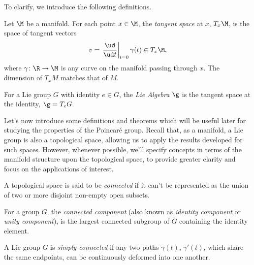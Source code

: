 To clarify, we introduce the following definitions.

\begin{definition}
    Let $\M$ be a manifold. For each point $x \in \M$, the \emph{tangent space} at $x$, $T_x \M$, is the space of tangent vectors
    \begin{equation}
        v = \left. \frac{\ud}{\ud t}\right|_{t=0} \gamma(t)  \in T_x \M,
    \end{equation}
    where $\gamma\colon \R \to \M$ is any curve on the manifold passing through $x$. The dimension of $T_xM$ matches that of $M$.
\end{definition}

\begin{definition}
    For a Lie group $G$ with identity $e \in G$, the \emph{Lie Algebra} $\g$ is the tangent space at the identity, $\g = T_e G$.
\end{definition}


Let's now introduce some definitions and theorems which will be useful later for studying the properties of the Poincaré group. Recall that, as a manifold, a Lie group is also a topological space, allowing us to apply the results developed for such spaces. However, whenever possible, we'll specify concepts in terms of the manifold structure upon the topological space, to provide greater clarity and focus on the applications of interest.

\begin{definition}\label{def:connected}
    A topological space is said to be \emph{connected} if it can't be represented as the union of two or more disjoint non-empty open subsets.
\end{definition}

\begin{definition}\label{def:connected-component}
    For a group $G$, the \emph{connected component} (also known as \emph{identity component} or \emph{unity component}), is the largest connected subgroup of $G$ containing the identity element.
\end{definition}

\begin{definition}\label{def:simply-connected}
    A Lie group $G$ is \emph{simply connected} if any two paths $\gamma(t)$, $\gamma'(t)$, which share the same endpoints, can be continuously deformed into one another.
\end{definition}


